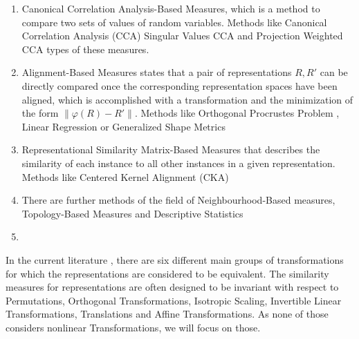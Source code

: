

\begin{enumerate}
    \item Canonical Correlation Analysis-Based Measures, which is a method to compare two sets of values of random variables.
    Methods like Canonical Correlation Analysis (CCA) \cite{Hardoon2004CanonicalCA} %
    Singular Values CCA \cite{raghu2017svccasingularvectorcanonical} and Projection Weighted CCA \cite{morcos2018insightsrepresentationalsimilarityneural} types of these measures. 
    \item Alignment-Based Measures states that a pair of representations $R, R'$ can be directly compared once the corresponding representation spaces have been aligned, which is accomplished with a transformation and the minimization of the form $\|\varphi (R)-R'\|$. 
    Methods like Orthogonal Procrustes Problem \cite{williams_generalized_2021, ding_NEURIPS2021_0c0bf917, schonemann_generalized_1966}, Linear Regression \cite{kornblith_similarity_2019, li2016convergentlearningdifferentneural, bau2018identifyingcontrollingimportantneurons} or Generalized Shape Metrics \cite{williams_generalized_2021, duong2023representationaldissimilaritymetricspaces, kingma2022autoencodingvariationalbayes, ostrow2023geometrycomparingtemporalstructure}
    \item Representational Similarity Matrix-Based Measures that describes the similarity of each instance to all other instances in a given representation.
    Methods like Centered Kernel Alignment (CKA) \cite{kornblith_similarity_2019}%
    \item There are further methods of the field of Neighbourhood-Based measures, Topology-Based Measures and Descriptive Statistics 
    \item 
\end{enumerate}


In the current literature \cite{kornblith_similarity_2019, li2016convergentlearningdifferentneural, tsitsulin2020shapedataintrinsicdistance, williams_generalized_2021}, there are six different main groups of transformations for which the representations are considered to be equivalent.
The similarity measures for representations are often designed to be invariant with respect to Permutations, Orthogonal Transformations, Isotropic Scaling, Invertible Linear Transformations, Translations and Affine Transformations. 
As none of those considers nonlinear Transformations, we will focus on those. 